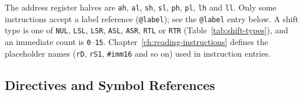 The address register halves are \texttt{ah}, \texttt{al}, \texttt{sh}, \texttt{sl}, \texttt{ph}, \texttt{pl},
\texttt{lh} and \texttt{ll}. Only some instructions accept a label reference (\texttt{@label}); see the \texttt{@label}
entry below. A shift type is one of \texttt{NUL}, \texttt{LSL}, \texttt{LSR}, \texttt{ASL}, \texttt{ASR}, \texttt{RTL}
or \texttt{RTR} (Table~\ref{tab:shift-types}), and an immediate count is \texttt{0}--\texttt{15}.
Chapter~\ref{ch:reading-instructions} defines the placeholder names (\texttt{rD}, \texttt{rS1}, \texttt{\#imm16} and so
on) used in instruction entries.

\subsection*{Directives and Symbol References}

